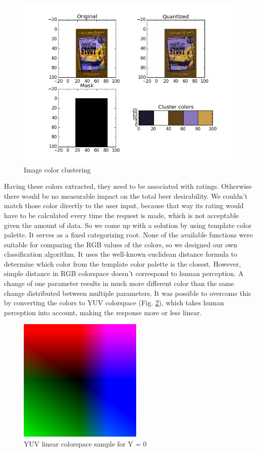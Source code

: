 \documentclass[10pt]{IEEEtran}
\begin{document}
\begin{figure}[b]
  \centering
  \includegraphics[width=\columnwidth]{./graphics/1.png}
  \caption{Image color clustering}
  \label{fig:colorClustering}
\end{figure}

Having these colors extracted, they need to be associated with ratings. Otherwise there would be no measurable impact on the total beer desirability. We couldn't match those color directly to the user input, because that way its rating would have to be calculated  every time the request is made, which is not acceptable given the amount of data. So we come up with a solution by using template color palette. It serves as a fixed categorizing root. None of the available functions were suitable for comparing the RGB values of the colors, so we designed our own classification algorithm. It uses the well-known euclidean distance formula to determine which color from the template color palette is the closest. However, simple distance in RGB colorspace doesn't correspond to human perception. A change of one parameter results in much more different color than the same change distributed between multiple parameters. It was possible to overcome this by converting the colors to YUV colorspace (Fig. \ref{fig:colorspace}), which takes human perception into account, making the response more or less linear. 


\begin{figure}[t]
  \centering
  \includegraphics[width=6cm]{./graphics/YUV.png}
  \caption{YUV linear colorspace sample for Y = 0}
  \label{fig:colorspace}
\end{figure}
\end{document}
